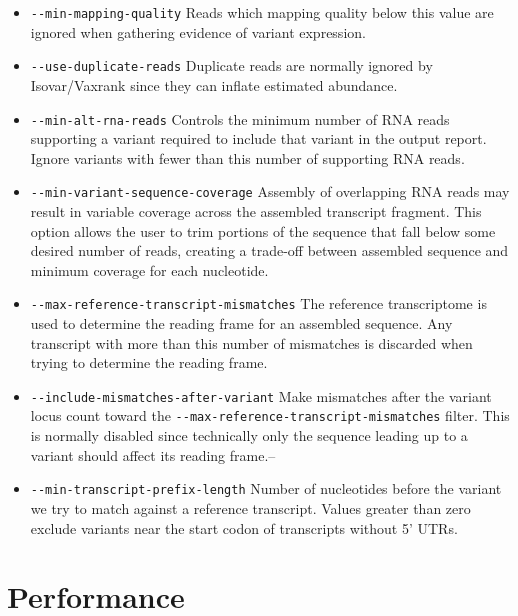 \documentclass[10pt,letterpaper]{article}
\begin{document}
\begin{itemize}
	\item \verb|--min-mapping-quality| Reads which mapping quality below this value are ignored when gathering evidence of variant expression. 
	
	\item \verb|--use-duplicate-reads| Duplicate reads are normally ignored by Isovar/Vaxrank since they can inflate estimated abundance.
	
	
	\item \verb|--min-alt-rna-reads| Controls the minimum number of RNA reads supporting a variant required to include that variant in the output report. Ignore variants with fewer than this number of supporting RNA reads.
	
	\item \verb|--min-variant-sequence-coverage| Assembly of overlapping RNA reads may result in variable coverage across the assembled transcript fragment. This option allows the user to trim portions of the sequence that fall below some desired number of reads, creating a trade-off between assembled sequence and minimum coverage for each nucleotide.
	
	\item \verb|--max-reference-transcript-mismatches| The reference transcriptome is used to determine the reading frame for an assembled sequence. Any transcript with more than this number of mismatches is discarded when trying to determine the reading frame.
	
	\item \verb|--include-mismatches-after-variant| Make mismatches after the variant locus count toward the \verb|--max-reference-transcript-mismatches|
	filter. This is normally disabled since technically only the sequence leading up to a variant should affect its reading frame.--
	
	
	\item \verb|--min-transcript-prefix-length| Number of nucleotides before the variant we try to match against a reference transcript. Values greater
	than zero exclude variants near the start codon of
	transcripts without 5' UTRs.
\end{itemize}

\section*{Performance}
\end{document}
